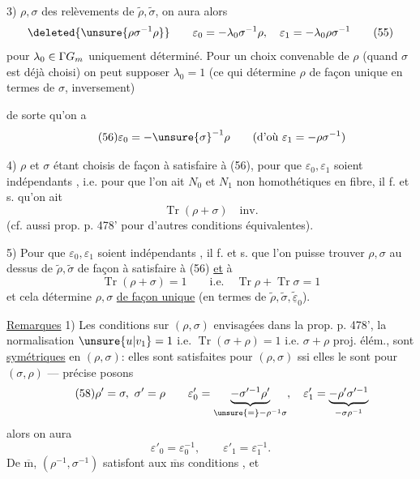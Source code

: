 3)  $\rho,\sigma$ des relèvements de
$\widetilde\rho,\widetilde\sigma$, on aura alors
\[
  \deleted{\unsure{\rho\sigma^{-1}\rho}}\qquad
  \varepsilon_0=-\lambda_0\sigma^{-1}\rho,\quad
  \varepsilon_1=-\lambda_0\rho\sigma^{-1} \tag{55}
\]
pour $\lambda_0\in\Gamma\mathbb \mathbb G_m$ uniquement déterminé.
Pour un choix convenable de $\rho$ (quand $\sigma$ est déjà choisi)
on peut supposer $\lambda_0=1$
(ce qui détermine $\rho$ de façon unique en
 termes de $\sigma$,  inversement)



 de sorte qu'on a
\[
\tag{56}
\varepsilon_0=-\unsure{\sigma}^{-1}\rho
\qquad(\text{d'où }\varepsilon_1=-\rho\sigma^{-1})
\]

4) $\rho$ et $\sigma$ étant choisis de façon à satisfaire à (56), pour que $\varepsilon_0,\varepsilon_1$ soient  indépendants , i.e. pour que l'on ait $N_0$ et $N_1$ non homothétiques en  fibre, il f. et s. qu'on ait
\[
\tag{57}
\operatorname{Tr}(\rho+\sigma)\quad\text{inv.}
\]
(cf. aussi prop. p. 478' pour d'autres conditions équivalentes).

5) Pour que $\varepsilon_0,\varepsilon_1$ soient indépendants , il f. et s. que l'on  puisse trouver  $\rho,\sigma$ au dessus de $\widetilde\rho,\widetilde\sigma$ de façon à satisfaire à (56) \uline{et} à
\[
\tag{57'}
\operatorname{Tr}(\rho+\sigma)=1
\qquad\text{i.e.}\quad
\operatorname{Tr}\rho+\operatorname{Tr}\sigma=1
\]
et cela détermine $\rho,\sigma$ \uline{de façon unique} (en termes de $\widetilde\rho,\widetilde\sigma,\underline{\widetilde\varepsilon}_0$).

\uline{Remarques} 1) Les conditions sur $(\rho,\sigma)$ envisagées dans la prop. p. 478',  la normalisation $\unsure{u|v_1}=1$ i.e. $\operatorname{Tr}(\sigma+\rho)=1$ i.e. $\sigma+\rho$ proj. élém., sont \uline{symétriques} en $(\rho,\sigma)$: elles sont satisfaites pour $(\rho,\sigma)$ ssi elles le sont pour $(\sigma,\rho)$ ---   précise posons
\[
\tag{58}
\rho'=\sigma,\ \sigma'=\rho\qquad
\varepsilon'_0=\underbrace{-\sigma'^{-1}\rho'}_{\unsure{=}-\rho^{-1}\sigma},\quad
\varepsilon'_1=\underbrace{-\rho'\sigma'^{-1}}_{-\sigma\rho^{-1}}
\]
alors on aura
\[
\tag{59}
\varepsilon'_0=\varepsilon_0^{-1},\qquad
\varepsilon'_1=\varepsilon_1^{-1}.
\]
De $\overline{\mathrm m}$, $(\rho^{-1},\sigma^{-1})$ satisfont aux $\overline{\mathrm m}$s conditions , et 


